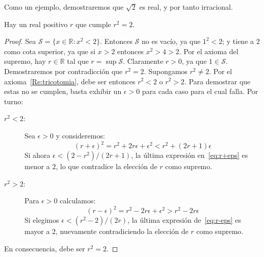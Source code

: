   Como un ejemplo,
  demostraremos que \(\sqrt{2}\) es real,%
  y por tanto irracional.
  \begin{theorem}
    \label{theo:sqrt(2)-real}
    Hay un real positivo \(r\) que cumple \(r^2 = 2\).
  \end{theorem}
  \begin{proof}
    Sea \(\mathcal{S} = \{x \in \mathbb{R} \colon x^2 < 2\}\).
    Entonces \(\mathcal{S}\) no es vacío,
    ya que \(1^2 < 2\);
    y tiene a \(2\) como cota superior,
    ya que si \(x > 2\) entonces \(x^2 > 4 > 2\).
    Por el axioma del supremo,
    hay \(r \in \mathbb{R}\) tal que \(r = \sup \mathcal{S}\).
    Claramente \(r > 0\),
    ya que \(1 \in \mathcal{S}\).
    Demostraremos por contradicción que \(r^2 = 2\).
    Supongamos \(r^2 \ne 2\).
    Por el axioma~\ref{Re:tricotomia},
    debe ser entonces \(r^2 < 2\) o \(r^2 > 2\).
    Para demostrar que estas no se cumplen,
    basta exhibir un \(\epsilon > 0\) para cada caso
    para el cual falla.
    Por turno:
    \begin{description}
    \item[\boldmath\(r^2 < 2\):\unboldmath]
      Sea \(\epsilon > 0\)
      y consideremos:
      \begin{equation}
	\label{eq:r+eps}
	(r + \epsilon)^2
	  = r^2 + 2 r \epsilon + \epsilon^2
	  < r^2 + (2 r + 1) \epsilon
      \end{equation}
      Si ahora \(\epsilon < (2 - r^2) / (2 r + 1)\),
      la última expresión en~\eqref{eq:r+eps} es menor a \(2\),
      lo que contradice la elección de \(r\) como supremo.
    \item[\boldmath\(r^2 > 2\):\unboldmath]
      Para \(\epsilon > 0\)
      calculamos:
      \begin{equation}
	\label{eq:r-eps}
	(r - \epsilon)^2
	  = r^2 - 2 r \epsilon + \epsilon^2
	  > r^2 - 2 r \epsilon
      \end{equation}
      Si elegimos \(\epsilon < (r^2 - 2) / (2 r)\),
      la última expresión de~\eqref{eq:r-eps} es mayor a \(2\),
      nuevamente contradiciendo la elección de \(r\) como supremo.
    \end{description}
    En consecuencia,
    debe ser \(r^2 = 2\).
  \end{proof}

